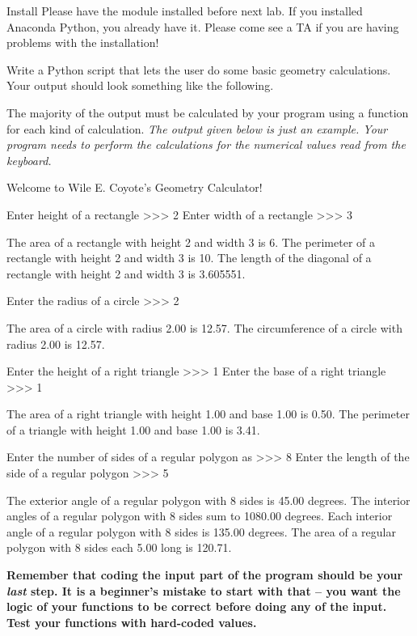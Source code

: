 \documentclass[11pt]{cselabheader}
\begin{document}
{\begin{warningbox}{Install}
  Please have the  module installed before next lab. If
  you installed Anaconda Python, you already have it. Please come see a TA if
  you are having problems with the installation!
\end{warningbox}


\begin{ex}[geometry.py] Write a Python script that lets the user do some basic
  geometry calculations. Your output should look something like the following.

  The majority of the output must be calculated by your program using a function
  for each kind of calculation. \emph{The output given below is just an example.
  Your program needs to perform the calculations for the numerical values read
  from the keyboard.}

  \begin{verbatimcode}
Welcome to Wile E. Coyote's Geometry Calculator!

Enter height of a rectangle >>> 2
Enter width of a rectangle >>> 3

The area of a rectangle with height 2 and width 3 is 6.
The perimeter of a rectangle with height 2 and width 3 is 10.
The length of the diagonal of a rectangle with height 2 and width 3 is 3.605551.

Enter the radius of a circle >>> 2

The area of a circle with radius 2.00 is 12.57.
The circumference of a circle with radius 2.00 is 12.57.

Enter the height of a right triangle >>> 1
Enter the base of a right triangle >>> 1

The area of a right triangle with height 1.00 and base 1.00 is 0.50.
The perimeter of a triangle with height 1.00 and base 1.00 is 3.41.

Enter the number of sides of a regular polygon as >>> 8
Enter the length of the side of a regular polygon >>> 5

The exterior angle of a regular polygon with 8 sides is 45.00 degrees.
The interior angles of a regular polygon with 8 sides sum to 1080.00 degrees.
Each interior angle of a regular polygon with 8 sides is 135.00 degrees.
The area of a regular polygon with 8 sides each 5.00 long is 120.71.
  \end{verbatimcode}

  \begin{center}
    \bfseries Remember that coding the input part of the program should be your
    \emph{last} step. It is a beginner's mistake to start with that -- you want
    the logic of your functions to be correct before doing any of the input.
    Test your functions with hard-coded values.
  \end{center}


\end{ex}}
\end{document}

